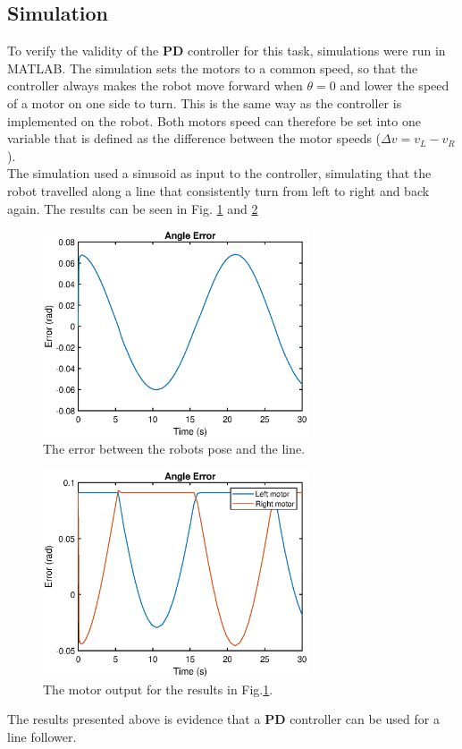 \subsection{Simulation}

To verify the validity of the \textbf{PD} controller for this task, simulations were run in MATLAB. The simulation sets the motors to a common speed, so that the controller always makes the robot move forward when $\theta=0$ and lower the speed of a motor on one side to turn. This is the same way as the controller is implemented on the robot. Both motors speed can therefore be set into one variable that is defined as the difference between the motor speeds ($\Delta v = v_L-v_R$). \\
\indent The simulation used a sinusoid as input to the controller, simulating that the robot travelled along a line that consistently turn from left to right and back again. The results can be seen in Fig. \ref{fig:sim_t_error} and \ref{fig:sim_LR_motor}

\begin{figure}[H]
    \centering
    \includegraphics[width=0.7\textwidth]{img/theta_error.eps}
    \caption{The error between the robots pose and the line.}
    \label{fig:sim_t_error}
\end{figure}

\begin{figure}[H]
    \centering
    \includegraphics[width=0.7\textwidth]{img/LR_motors.eps}
    \caption{The motor output for the results in Fig.\ref{fig:sim_t_error}.}
    \label{fig:sim_LR_motor}
\end{figure}

The results presented above is evidence that a \textbf{PD} controller can be used for a line follower. 
